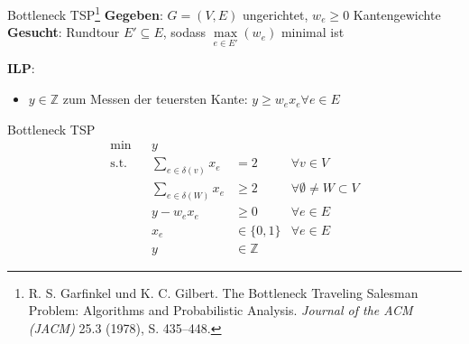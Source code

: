 \documentclass[ngerman,aspectratio=169,10pt]{beamer}
\begin{document}
\begin{frame}{Bottleneck TSP\footnote{R. S. Garfinkel und K. C. Gilbert. The Bottleneck Traveling Salesman Problem: Algorithms and Probabilistic Analysis. \emph{Journal of the ACM (JACM)} 25.3 (1978), S. 435–448.}}
	\textbf{Gegeben}: $G=(V,E)$ ungerichtet, $w_e\geq0$ Kantengewichte\\
	\textbf{Gesucht}: Rundtour $E'\subseteq E$, sodass $\max\limits_{e\in E'}(w_e)$ minimal ist
	
	\textbf{ILP}:
	\begin{itemize}
		\item $y\in\mathbb{Z}$ zum Messen der teuersten Kante: $y\geq w_e x_e \forall e\in E$
	\end{itemize}
\end{frame}
\begin{frame}{Bottleneck TSP}
	\begin{align*}
	\min && y &&\\
	\text{s.t.} && \sum_{e\in \delta(v)}x_e &=2 &\forall v\in V\\
	&& \sum_{e\in \delta(W)}x_e &\geq2 &\forall \emptyset\neq W\subset V\\
	&& y - w_e x_e &\geq0 &\forall e \in E\\
	&& x_e &\in\{0,1\} &\forall e\in E\\
	&& y &\in\mathbb{Z} &
	\end{align*}
\end{frame}
\end{document}
